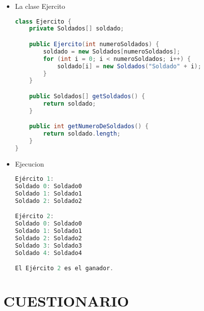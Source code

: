 \documentclass{article}
\begin{document}
\begin{itemize}
    \item La clase Ejercito
    \begin{lstlisting}[language=java]
class Ejercito {
    private Soldados[] soldado;

    public Ejercito(int numeroSoldados) {
        soldado = new Soldados[numeroSoldados];
        for (int i = 0; i < numeroSoldados; i++) {
            soldado[i] = new Soldados("Soldado" + i);
        }
    }

    public Soldados[] getSoldados() {
        return soldado;
    }

    public int getNumeroDeSoldados() {
        return soldado.length;
    }
}
    \end{lstlisting}

    \item Ejecucion
    \begin{lstlisting}[language=java]
Ejército 1:
Soldado 0: Soldado0
Soldado 1: Soldado1
Soldado 2: Soldado2

Ejército 2:
Soldado 0: Soldado0
Soldado 1: Soldado1
Soldado 2: Soldado2
Soldado 3: Soldado3
Soldado 4: Soldado4

El Ejército 2 es el ganador.
    \end{lstlisting}
    
	\end{itemize}
 
    \section{CUESTIONARIO}
\end{document}
